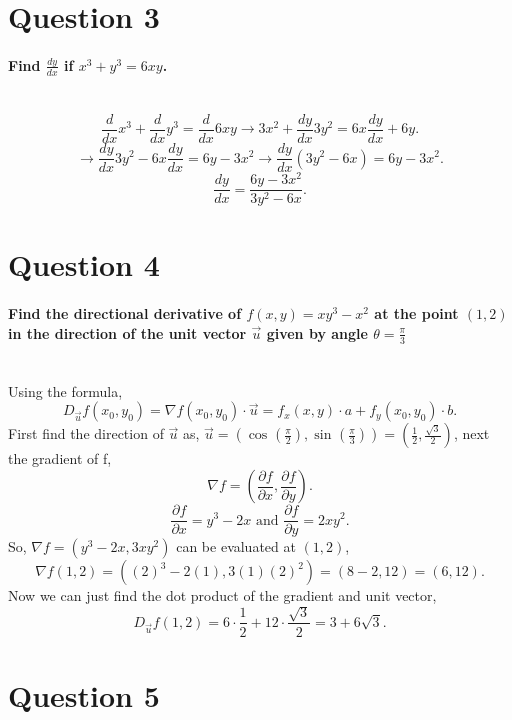 \section{Question 3}%
\label{sec: Question 3 }
\paragraph{Find $ \frac{ dy }{ dx }  $ if $ x^3+y^3=6xy $. \\ \\}
\[
\frac{ d }{ dx } x^3 + \frac{ d }{ dx } y^3 = \frac{ d }{ dx } 6xy \to 3x^2+\frac{ dy }{ dx } 3y^2= 6x\frac{ dy }{ dx } + 6y
.\] 
\[
\to \frac{ dy }{ dx } 3y^2 - 6x \frac{ dy }{ dx }  = 6y -3x^2 \to \frac{ dy }{ dx } \left( 3y^2-6x \right) = 6y-3x^2
.\] 
\[
\frac{ dy }{ dx } = \frac{ 6y-3x^2 }{ 3y^2-6x }
.\] 
\section{Question 4}%
\label{sec: Question 4 }
\paragraph{Find the directional derivative of $ f\left( x,y \right) = xy^3-x^2 $ at the point $ \left( 1,2 \right)  $ in the direction of the unit vector $ \vec{ u } $ given by angle $ \theta = \frac{ \pi }{ 3 } $ \\ \\}
Using the formula,
\[
D_{ \vec{ u } }f\left( x_0,y_0 \right) = \nabla f\left( x_0,y_0 \right) \cdot \vec{ u } = f_x\left( x,y \right) \cdot a + f_y\left( x_0,y_0 \right) \cdot b
.\] 
First find the direction of $ \vec{ u } $ as, $ \vec{ u } = \left( \cos^{  } \left( \frac{ \pi }{ 2 }  \right) , \sin^{  } \left( \frac{ \pi }{ 3 }  \right)  \right) = \left( \frac{ 1 }{ 2 } ,\frac{ \sqrt{ 3 }  }{ 2 } \right)  $, next the gradient of f,
\[
\nabla f = \left( \frac{ \partial f}{\partial x} , \frac{ \partial f}{\partial y}  \right) 
.\] 
\[
\frac{ \partial f}{\partial x} = y^3-2x \text{ and } \frac{ \partial f}{\partial y} = 2xy^2
.\] 
So, $ \nabla f = \left( y^3-2x, 3xy^2 \right)  $ can be evaluated at $ \left( 1,2 \right)  $,
\[
\nabla f\left( 1,2 \right) = \left( \left( 2 \right) ^3 -2\left( 1 \right) ,3\left( 1 \right) \left( 2 \right) ^2\right) = \left( 8-2,12 \right) = \left( 6,12 \right) 
.\] 
Now we can just find the dot product of the gradient and unit vector,
\[
D_{ \vec{ u } }f\left( 1,2 \right) = 6 \cdot \frac{ 1 }{ 2 } + 12 \cdot \frac{ \sqrt{ 3 }  }{ 2 }= 3+6\sqrt{ 3 } 
.\] 
\section{Question 5}%
\label{sec: Question 5 }
